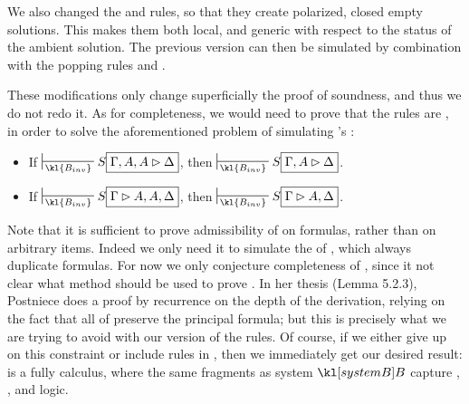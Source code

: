 \begin{remark}
  We also changed the \rsf{\bot{-}} and \rsf{\top{+}} rules, so that they create
  polarized, closed empty solutions. This makes them both local, and generic
  with respect to the status of the ambient solution. The previous version can
  then be simulated by combination with the popping rules  and
  .
\end{remark}

These modifications only change superficially the proof of soundness, and thus
we do not redo it. As for completeness, we would need to prove that the
 rules are , in order to solve the aforementioned problem
of simulating 's :

\begin{lemma}
  \sbr
  \begin{itemize}
    \item If $\prov{\kl{B_{inv}}} S\select{\Gamma, A, A \J \Delta}$, then
          $\prov{\kl{B_{inv}}} S\select{\Gamma, A \J \Delta}$.
    \item If $\prov{\kl{B_{inv}}} S\select{\Gamma \J A, A, \Delta}$, then
          $\prov{\kl{B_{inv}}} S\select{\Gamma \J A, \Delta}$.
  \end{itemize}
\end{lemma}

Note that it is sufficient to prove admissibility of  on
formulas, rather than on arbitrary items. Indeed we only need it to simulate the
 of , which always duplicate formulas. For now
we only conjecture completeness of , since it not clear what method
should be used to prove . In her thesis
\cite{postniece_proof_2010} (Lemma 5.2.3), Postniece does a proof by recurrence
on the depth of the derivation, relying on the fact that all  of  preserve the principal formula; but this is precisely what
we are trying to avoid with our version of the rules. Of course, if we either
give up on this constraint or include  rules in , then we
immediately get our desired result:  is a fully  calculus,
where the same fragments as system $\sysB$ capture ,
,  and  logic.

